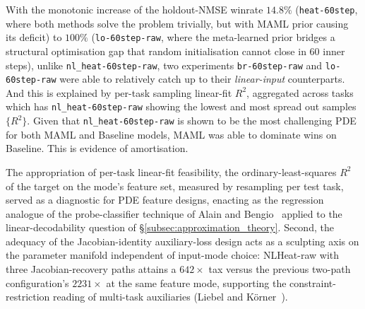 \documentclass[10pt,journal,compsoc]{IEEEtran}
\begin{document}
With the monotonic increase of the holdout-NMSE winrate $14.8\%$
(\texttt{heat-60step}, where both methods solve the problem trivially, but with
MAML prior causing its deficit) to $100\%$ (\texttt{lo-60step-raw}, where the
meta-learned prior bridges a structural optimisation gap that random
initialisation cannot close in 60 inner steps), unlike
\texttt{nl\_heat-60step-raw}, two experiments \texttt{br-60step-raw} and
\texttt{lo-60step-raw} were able to relatively catch up to their
\emph{linear-input} counterparts. And this is explained by per-task sampling
linear-fit $R^2$, aggregated across tasks which has
\texttt{nl\_heat-60step-raw} showing the lowest and most spread out samples
$\{R^2\}$. Given that \texttt{nl\_heat-60step-raw} is shown to be the most
challenging PDE for both MAML and Baseline models, MAML was able to dominate
wins on Baseline. This is evidence of amortisation.

The appropriation of per-task linear-fit feasibility, the
ordinary-least-squares $R^2$ of the target on the mode's feature set, measured
by resampling per test task, served as a diagnostic for PDE feature designs,
enacting as the regression analogue of the probe-classifier technique of Alain
and Bengio~\cite{alain2017} applied to the linear-decodability question of
\S\ref{subsec:approximation_theory}. Second, the adequacy of the
Jacobian-identity auxiliary-loss design acts as a sculpting axis on the
parameter manifold independent of input-mode choice: NLHeat-raw with three
Jacobian-recovery paths attains a $642\times$ tax versus the previous two-path
configuration's $2231\times$ at the same feature mode, supporting the
constraint-restriction reading of multi-task auxiliaries (Liebel and
K\"orner~\cite{liebel2018}).
\end{document}
